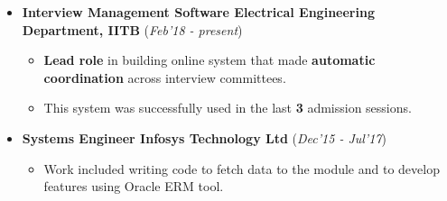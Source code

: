\documentclass[10pt]{article}
\begin{document}
\colorbox{bl}{}

\begin{itemize}[leftmargin=0.4cm]
    \item \textbf{Interview Management Software \textpipe \hspace{0.05cm} Electrical Engineering Department, IITB} \hfill{(\textit{Feb'18 - present})}
	\begin{itemize}
		\item \textbf{Lead role} in building online system that made \textbf{automatic coordination} across interview committees.
		\item  This system was successfully used in the last \textbf{3} admission sessions.
	\end{itemize}
\end{itemize}
    

\begin{itemize}[leftmargin=0.4cm]
    \item \textbf{Systems Engineer \textpipe  \hspace{0.05cm} Infosys Technology Ltd} \hfill{(\textit{Dec'15 - Jul'17})}
    \begin{itemize}
    	\item  Work included writing code to fetch data to the module and to develop features using Oracle ERM tool.
    \end{itemize}
        
\end{itemize}


\colorbox{bl}{}
\end{document}
